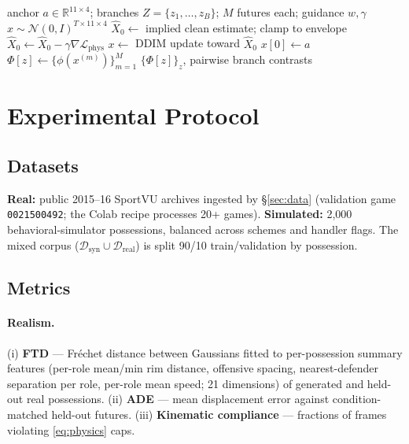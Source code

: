 \documentclass[11pt]{article}
\newcommand{\R}{\mathbb{R}}
\newcommand{\loss}{\mathcal{L}}
\begin{document}
\begin{algorithm}[t]
\caption{Counterfactual branch sampling}
\label{alg:cf}
\begin{algorithmic}[1]
\Require anchor $a \in \R^{11 \times 4}$; branches $Z = \{z_1, \dots, z_B\}$;
$M$ futures each; guidance $w, \gamma$
  \State $x \sim \mathcal{N}(0, I)^{T \times 11 \times 4}$
   
     \State $\hat X_0 \leftarrow$ implied clean estimate; clamp to envelope
     \State $\hat X_0 \leftarrow \hat X_0 - \gamma \nabla \loss_{\text{phys}}$
     \State $x \leftarrow$ DDIM update toward $\hat X_0$
  \EndFor
  \State $x[0] \leftarrow a$ 
  \State $\Phi[z] \leftarrow \{ \phi(x^{(m)}) \}_{m=1}^{M}$ 
\EndFor
\State \Return $\{\Phi[z]\}_z$, pairwise branch contrasts
\end{algorithmic}
\end{algorithm}

\section{Experimental Protocol}
\label{sec:experiments}

\subsection{Datasets}
\label{sec:datasets}

\textbf{Real:} public 2015--16 SportVU archives ingested by
\S\ref{sec:data} (validation game \texttt{0021500492}; the Colab recipe
processes 20+ games). \textbf{Simulated:} 2{,}000 behavioral-simulator
possessions, balanced across schemes and handler flags. The mixed corpus
($\mathcal{D}_{\text{syn}} \cup \mathcal{D}_{\text{real}}$) is split 90/10
train/validation by possession.

\subsection{Metrics}
\label{sec:metrics}

\paragraph{Realism.}
(i) \textbf{FTD} --- Fr\'echet distance between Gaussians fitted to
per-possession summary features (per-role mean/min rim distance, offensive
spacing, nearest-defender separation per role, per-role mean speed; 21
dimensions) of generated and held-out real possessions. (ii) \textbf{ADE} ---
mean displacement error against condition-matched held-out futures. (iii)
\textbf{Kinematic compliance} --- fractions of frames violating
\eqref{eq:physics} caps.
\end{document}
